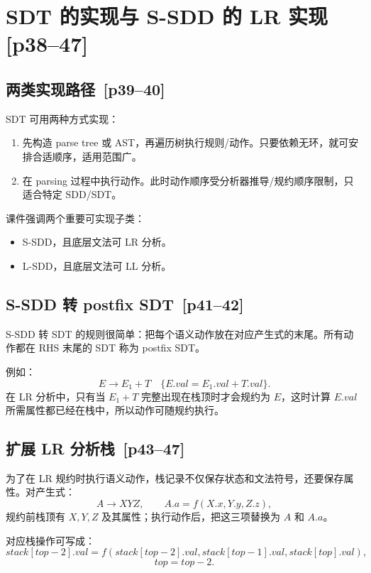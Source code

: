 \documentclass[UTF8,fontset=none,11pt]{ctexart}
\newcommand{\pg}[1]{\texorpdfstring{{\small\color{graytext}\,[p#1]}}{ [p#1]}}
\begin{document}
\section{SDT 的实现与 S-SDD 的 LR 实现 \pg{38--47}}

\subsection{两类实现路径 \pg{39--40}}

SDT 可用两种方式实现：

\begin{enumerate}
  \item 先构造 parse tree 或 AST，再遍历树执行规则/动作。只要依赖无环，就可安排合适顺序，适用范围广。
  \item 在 parsing 过程中执行动作。此时动作顺序受分析器推导/规约顺序限制，只适合特定 SDD/SDT。
\end{enumerate}

课件强调两个重要可实现子类：

\begin{itemize}
  \item S-SDD，且底层文法可 LR 分析。
  \item L-SDD，且底层文法可 LL 分析。
\end{itemize}

\subsection{S-SDD 转 postfix SDT \pg{41--42}}

S-SDD 转 SDT 的规则很简单：把每个语义动作放在对应产生式的末尾。所有动作都在 RHS 末尾的 SDT 称为 postfix SDT。

例如：
\[
E\to E_1+T\quad \{E.val=E_1.val+T.val\}.
\]
在 LR 分析中，只有当 \(E_1+T\) 完整出现在栈顶时才会规约为 \(E\)，这时计算 \(E.val\) 所需属性都已经在栈中，所以动作可随规约执行。

\subsection{扩展 LR 分析栈 \pg{43--47}}

为了在 LR 规约时执行语义动作，栈记录不仅保存状态和文法符号，还要保存属性。对产生式：
\[
A\to XYZ,\qquad A.a=f(X.x,Y.y,Z.z),
\]
规约前栈顶有 \(X,Y,Z\) 及其属性；执行动作后，把这三项替换为 \(A\) 和 \(A.a\)。

对应栈操作可写成：
\[
stack[top-2].val=f(stack[top-2].val,stack[top-1].val,stack[top].val),
\]
\[
top=top-2.
\]
\end{document}
